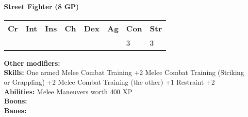 \documentclass[12pt,a4paper,openany]{book}
\begin{document}
	\paragraph*{Street Fighter (8 GP)}
	\textit{}\par
	\begin{tabular}{|l|l|l|l|l|l|l|l|}
		\hline
		Cr & Int & Ins & Ch & Dex & Ag & Con & Str \\ \hline
		&  &  &  &  &  & 3 & 3 \\ \hline
	\end{tabular}\par
	\noindent\textbf{Other modifiers:} \\
	\textbf{Skills:} One armed Melee Combat Training +2
	Melee Combat Training (Striking or Grappling) +2
	Melee Combat Training (the other) +1
	Restraint +2\\
	\textbf{Abilities:} Melee Maneuvers worth 400 XP\\
	\textbf{Boons:} \\
	\textbf{Banes:} \\
	
	
\end{document}
